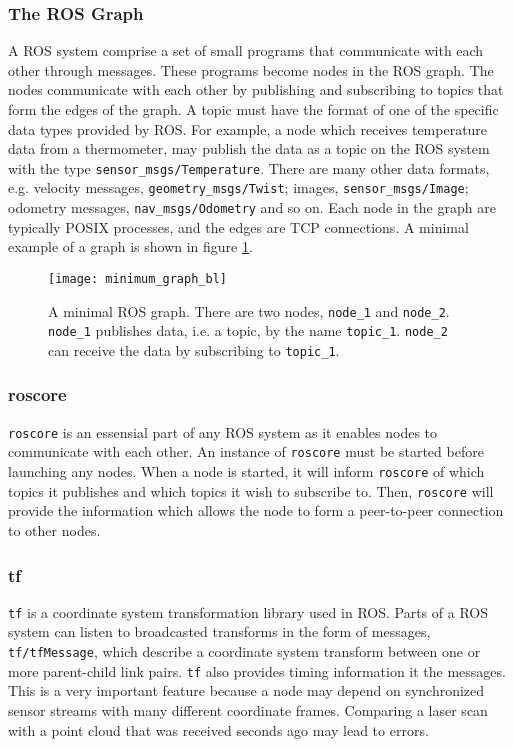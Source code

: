 \subsubsection{The ROS Graph}

A \ac{ROS} system comprise a set of small programs that communicate with each other through messages. These programs become nodes in the \ac{ROS} graph. The nodes communicate with each other by publishing and subscribing to topics that form the edges of the graph. A topic must have the format of one of the specific data types provided by \ac{ROS}. For example, a node which receives temperature data from a thermometer, may publish the data as a topic on the \ac{ROS} system with the type \texttt{sensor\_msgs/Temperature}. There are many other data formats, e.g. velocity messages, \texttt{geometry\_msgs/Twist}; images, \texttt{sensor\_msgs/Image}; odometry messages, \texttt{nav\_msgs/Odometry} and so on. Each node in the graph are typically POSIX processes, and the edges are TCP connections\cite{rosbook15}. A minimal example of a graph is shown in figure \ref{fig:minimum_graph}.

\begin{figure}[h]
    \centering
    \texttt{[image: minimum\_graph\_bl]}
    \caption{A minimal \ac{ROS} graph. There are two nodes, \texttt{node\_1} and \texttt{node\_2}. \texttt{node\_1} publishes data, i.e. a topic, by the name \texttt{topic\_1}. \texttt{node\_2} can receive the data by subscribing to \texttt{topic\_1}.}
    \label{fig:minimum_graph}
\end{figure}

\subsubsection{roscore}

\texttt{roscore} is an essensial part of any \ac{ROS} system as it enables nodes to communicate with each other. An instance of \texttt{roscore} must be started before launching any nodes. When a node is started, it will inform \texttt{roscore} of which topics it publishes and which topics it wish to subscribe to. Then, \texttt{roscore} will provide the information which allows the node to form a peer-to-peer connection to other nodes.

\subsubsection{tf}

\texttt{tf}\cite{tf_paper} is a coordinate system transformation library used in \ac{ROS}. Parts of a \ac{ROS} system can listen to broadcasted transforms in the form of messages, \texttt{tf/tfMessage}, which describe a coordinate system transform between one or more parent-child link pairs. \texttt{tf} also provides timing information it the messages. This is a very important feature because a node may depend on synchronized sensor streams with many different coordinate frames. Comparing a laser scan with a point cloud that was received seconds ago may lead to errors. 

